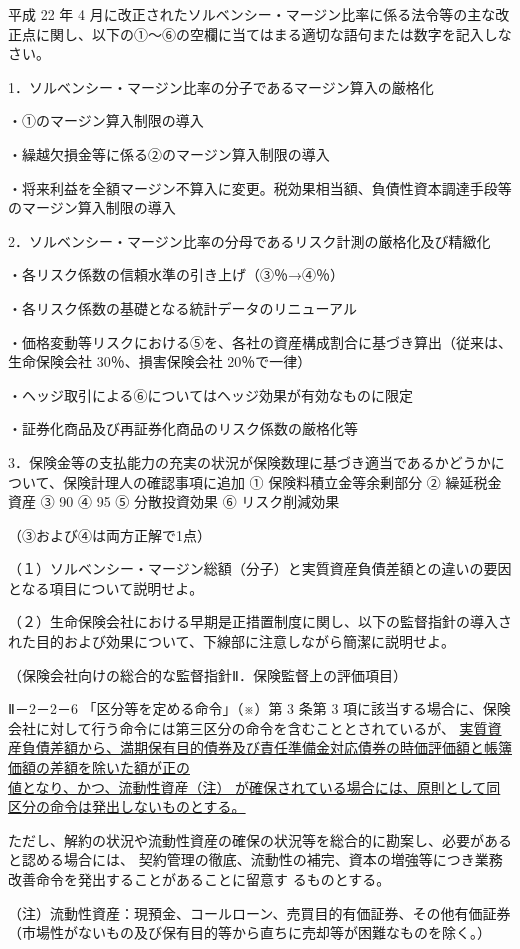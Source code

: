 \documentclass[report,gutter=10mm,fore-edge=10mm,uplatex,dvipdfmx]{jlreq}
\begin{document}
平成 22 年 4 月に改正されたソルベンシー・マージン比率に係る法令等の主な改正点に関し、以下の①～⑥の空欄に当てはまる適切な語句または数字を記入しなさい。

1．ソルベンシー・マージン比率の分子であるマージン算入の厳格化

・①のマージン算入制限の導入

・繰越欠損金等に係る②のマージン算入制限の導入

・将来利益を全額マージン不算入に変更。税効果相当額、負債性資本調達手段等のマージン算入制限の導入

2．ソルベンシー・マージン比率の分母であるリスク計測の厳格化及び精緻化

・各リスク係数の信頼水準の引き上げ（③％→④％）

・各リスク係数の基礎となる統計データのリニューアル

・価格変動等リスクにおける⑤を、各社の資産構成割合に基づき算出（従来は、生命保険会社
30％、損害保険会社 20％で一律）

・ヘッジ取引による⑥についてはヘッジ効果が有効なものに限定

・証券化商品及び再証券化商品のリスク係数の厳格化等

3．保険金等の支払能力の充実の状況が保険数理に基づき適当であるかどうかについて、保険計理人の確認事項に追加
\answer{}
① 保険料積立金等余剰部分 
② 繰延税金資産  
③ 90 
④ 95 
⑤ 分散投資効果 
⑥ リスク削減効果 

（③および④は両方正解で1点）

（１）ソルベンシー・マージン総額（分子）と実質資産負債差額との違いの要因となる項目について説明せよ。

（２）生命保険会社における早期是正措置制度に関し、以下の監督指針の導入された目的および効果について、下線部に注意しながら簡潔に説明せよ。

\begin{framed}
（保険会社向けの総合的な監督指針Ⅱ．保険監督上の評価項目）

 Ⅱ－2－2－6 「区分等を定める命令」（※）第 3 条第 3 項に該当する場合に、保険会社に対して行う命令には第三区分の命令を含むこととされているが、
 \underline{実質資産負債差額から、満期保有目的債券及び責任準備金対応債券の時価評価額と帳簿価額の差額を除いた額が正の\\}
\underline{値となり、かつ、流動性資産（注）
が確保されている場合には、原則として同区分の命令は発出しないものとする。}

ただし、解約の状況や流動性資産の確保の状況等を総合的に勘案し、必要があると認める場合には、
契約管理の徹底、流動性の補完、資本の増強等につき業務改善命令を発出することがあることに留意す
るものとする。

（注）流動性資産：現預金、コールローン、売買目的有価証券、その他有価証券（市場性がないもの及び保有目的等から直ちに売却等が困難なものを除く。）
\end{framed}
\end{document}
